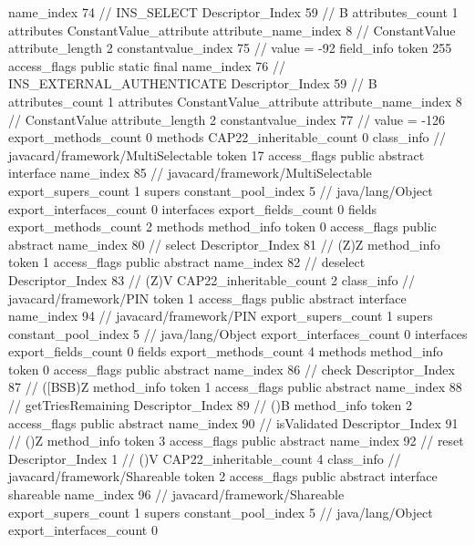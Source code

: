 {{{{{				name_index	74		// INS_SELECT
				Descriptor_Index	59		// B
				attributes_count	1
				attributes {
				ConstantValue_attribute {
					attribute_name_index	8		// ConstantValue
					attribute_length	2
					constantvalue_index	75		// value = -92
				}
				}
			}
			field_info {
				token	255
				access_flags	public static final
				name_index	76		// INS_EXTERNAL_AUTHENTICATE
				Descriptor_Index	59		// B
				attributes_count	1
				attributes {
				ConstantValue_attribute {
					attribute_name_index	8		// ConstantValue
					attribute_length	2
					constantvalue_index	77		// value = -126
				}
				}
			}
			}
			export_methods_count	0
			methods {
			}
			CAP22_inheritable_count	0
		}
		class_info {		// javacard/framework/MultiSelectable
			token	17
			access_flags	public abstract interface
			name_index	85		// javacard/framework/MultiSelectable
			export_supers_count	1
			supers {
				constant_pool_index	5		// java/lang/Object
			}
			export_interfaces_count	0
			interfaces {
			}
			export_fields_count	0
			fields {
			}
			export_methods_count	2
			methods {
				method_info {
					token	0
					access_flags	public abstract
					name_index	80		// select
					Descriptor_Index	81		// (Z)Z
				}
				method_info {
					token	1
					access_flags	public abstract
					name_index	82		// deselect
					Descriptor_Index	83		// (Z)V
				}
			}
			CAP22_inheritable_count	2
		}
		class_info {		// javacard/framework/PIN
			token	1
			access_flags	public abstract interface
			name_index	94		// javacard/framework/PIN
			export_supers_count	1
			supers {
				constant_pool_index	5		// java/lang/Object
			}
			export_interfaces_count	0
			interfaces {
			}
			export_fields_count	0
			fields {
			}
			export_methods_count	4
			methods {
				method_info {
					token	0
					access_flags	public abstract
					name_index	86		// check
					Descriptor_Index	87		// ([BSB)Z
				}
				method_info {
					token	1
					access_flags	public abstract
					name_index	88		// getTriesRemaining
					Descriptor_Index	89		// ()B
				}
				method_info {
					token	2
					access_flags	public abstract
					name_index	90		// isValidated
					Descriptor_Index	91		// ()Z
				}
				method_info {
					token	3
					access_flags	public abstract
					name_index	92		// reset
					Descriptor_Index	1		// ()V
				}
			}
			CAP22_inheritable_count	4
		}
		class_info {		// javacard/framework/Shareable
			token	2
			access_flags	public abstract interface shareable
			name_index	96		// javacard/framework/Shareable
			export_supers_count	1
			supers {
				constant_pool_index	5		// java/lang/Object
			}
			export_interfaces_count	0
}}}

